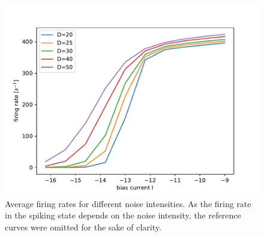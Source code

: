 \documentclass[12pt,a4paper]{article}
\begin{document}
\begin{figure}[H]
	\centering
	\includegraphics[scale=1]{gneursingle3realrinzelrangelong26d1realrinzelrange26d1.pdf}\caption{Average firing rates for different noise intensities. As the firing rate in the spiking state depends on the noise intensity, the reference curves were omitted for the sake of clarity.}
	\label{raterinzel}
\end{figure}
\end{document}
